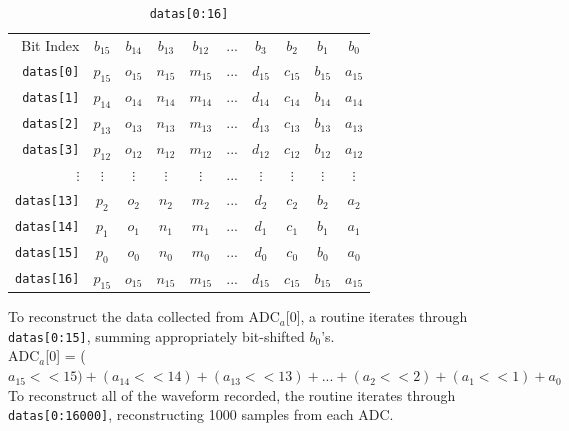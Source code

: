 \documentclass[11pt,twoside]{mitthesis}
\begin{document}
\begin{table}[h]
\begin{center}
\begin{tabular}{ r|c c c c c c c c c | }
\multicolumn{1}{r}{Bit Index}
 &  \multicolumn{1}{c}{$b_{15}$}
 &  \multicolumn{1}{c}{$b_{14}$}
 &  \multicolumn{1}{c}{$b_{13}$}
 &  \multicolumn{1}{c}{$b_{12}$}
 &  \multicolumn{1}{c}{$...$}
 &  \multicolumn{1}{c}{$b_{3}$}
 &  \multicolumn{1}{c}{$b_{2}$}
 &  \multicolumn{1}{c}{$b_{1}$}
 &  \multicolumn{1}{c}{$b_{0}$}\\
\cline{2-10}
\texttt{datas[0]} 
 & $p_{15}$ & $o_{15}$ & $n_{15}$ & $m_{15}$ & ... & $d_{15}$ & $c_{15}$ & $b_{15}$ & $a_{15}$
  \\ \cline{2-10} \cline{2-10}
 \texttt{datas[1]} 
 & $p_{14}$ & $o_{14}$ & $n_{14}$ & $m_{14}$ & ... & $d_{14}$ & $c_{14}$ & $b_{14}$ & $a_{14}$
  \\  \cline{2-10} 
 \texttt{datas[2]} 
 & $p_{13}$ & $o_{13}$ & $n_{13}$ & $m_{13}$ & ... & $d_{13}$ & $c_{13}$ & $b_{13}$ & $a_{13}$
  \\  \cline{2-10} 
 \texttt{datas[3]} 
 & $p_{12}$ & $o_{12}$ & $n_{12}$ & $m_{12}$ & ... & $d_{12}$ & $c_{12}$ & $b_{12}$ & $a_{12}$
  \\  \cline{2-10} 
$\vdots$\hspace{2em}
 & $\vdots$ & $\vdots$ & $\vdots$ & $\vdots$ & ... & $\vdots$ & $\vdots$ & $\vdots$ & $\vdots$
  \\  \cline{2-10} 
 \texttt{datas[13]}
 & $p_{2}$ & $o_{2}$ & $n_{2}$ & $m_{2}$ & ... & $d_{2}$ & $c_{2}$ & $b_{2}$ & $a_{2}$
  \\  \cline{2-10} 
 \texttt{datas[14]}
 & $p_{1}$ & $o_{1}$ & $n_{1}$ & $m_{1}$ & ... & $d_{1}$ & $c_{1}$ & $b_{1}$ & $a_{1}$
  \\  \cline{2-10} 
 \texttt{datas[15]}
 & $p_{0}$ & $o_{0}$ & $n_{0}$ & $m_{0}$ & ... & $d_{0}$ & $c_{0}$ & $b_{0}$ & $a_{0}$
  \\  \cline{2-10} 
 \texttt{datas[16]}
 & $p_{15}$ & $o_{15}$ & $n_{15}$ & $m_{15}$ & ... & $d_{15}$ & $c_{15}$ & $b_{15}$ & $a_{15}$
  \\  \cline{2-10} 
  
\end{tabular}
\end{center}
\caption{\texttt{datas[0:16]}}
\label{fig:data-reconstruct}
\end{table}

To reconstruct the data collected from ADC$_a$[0], a routine iterates through \texttt{datas[0:15]}, summing appropriately bit-shifted $b_0$'s.\\
ADC$_a$[0] = ($a_{15}<<15)+(a_{14}<<14)+(a_{13}<<13)+...+(a_{2}<<2)+(a_{1}<<1)+a_0$\\
To reconstruct all of the waveform recorded, the routine iterates through \texttt{datas[0:16000]}, reconstructing 1000 samples from each ADC.
\end{document}
